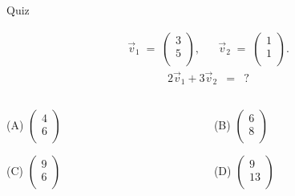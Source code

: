 \documentclass[german]{beamer}
\newcommand{\bq}{\begin{eqnarray*}}
\newcommand{\eq}{\end{eqnarray*}}
\begin{document}
\begin{frame}{Quiz}

\bq
 \vec{v}_1 \; = \; \left( \begin{array}{c} 3 \\ 5 \\ \end{array} \right),
 & &
 \vec{v}_2 \; = \; \left( \begin{array}{c} 1 \\ 1 \\ \end{array} \right).
\eq
\bq
 2 \vec{v}_1 + 3 \vec{v}_2 & = & ?
\eq 
\begin{columns}[b]
\begin{column}{5cm}
\begin{description}
\item{(A)} $\left( \begin{array}{c} 4 \\ 6 \\ \end{array} \right)$
\item{(C)} $\left( \begin{array}{c} 9 \\ 6 \\ \end{array} \right)$
\end{description}
\end{column}
\begin{column}{5cm}
\begin{description}
\item{(B)} $\left( \begin{array}{c} 6 \\ 8 \\ \end{array} \right)$
\item{(D)} $\left( \begin{array}{c} 9 \\ 13 \\ \end{array} \right)$
\end{description}
\end{column}
\end{columns}

\end{frame}
\end{document}
